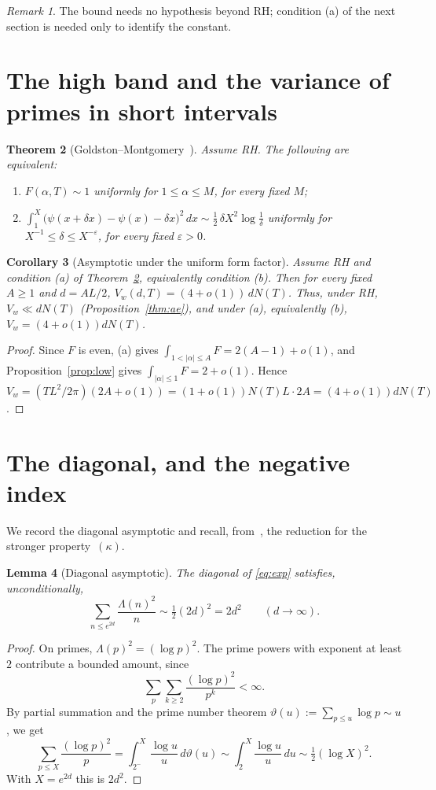 \documentclass[11pt]{amsart}
\newtheorem{theorem}{Theorem}[section]
\newtheorem{lemma}[theorem]{Lemma}
\newtheorem{corollary}[theorem]{Corollary}
\theoremstyle{definition}
\theoremstyle{remark}
\newtheorem{remark}[theorem]{Remark}
\begin{document}
\begin{remark}
The bound needs no hypothesis beyond RH; condition (a) of the next section is
needed only to identify the constant.
\end{remark}

\section{The high band and the variance of primes in short intervals}
\begin{theorem}[Goldston--Montgomery~\cite{GM}]\label{thm:gm}
Assume RH. The following are equivalent:
\begin{enumerate}
\item[(a)] $F(\alpha,T)\sim1$ uniformly for $1\le\alpha\le M$, for every fixed $M$;
\item[(b)] $\displaystyle\int_1^X\bigl(\psi(x+\delta x)-\psi(x)-\delta x\bigr)^2\,dx
\sim\tfrac12\,\delta X^2\log\tfrac1\delta$ uniformly for $X^{-1}\le\delta\le X^{-\varepsilon}$,
for every fixed $\varepsilon>0$.
\end{enumerate}
\end{theorem}

\begin{corollary}[Asymptotic under the uniform form factor]\label{cor:noncirc}
Assume RH and condition \emph{(a)} of Theorem~\ref{thm:gm}, equivalently
condition \emph{(b)}. Then for every fixed $A\ge1$ and $d=AL/2$,
$V_w(d,T)=(4+o(1))\,dN(T)$. Thus, under RH, $V_w\ll dN(T)$
(Proposition~\ref{thm:ae}), and under (a), equivalently (b), $V_w=(4+o(1))dN(T)$.
\end{corollary}
\begin{proof}
Since $F$ is even, (a) gives $\int_{1<|\alpha|\le A}F=2(A-1)+o(1)$, and
Proposition~\ref{prop:low} gives $\int_{|\alpha|\le1}F=2+o(1)$. Hence
$V_w=(TL^2/2\pi)(2A+o(1))=(1+o(1))N(T)L\cdot2A=(4+o(1))dN(T)$.
\end{proof}

\section{The diagonal, and the negative index}\label{sec:kappa}
We record the diagonal asymptotic and recall, from~\cite{RP16}, the reduction
for the stronger property~$(\kappa)$.

\begin{lemma}[Diagonal asymptotic]\label{lem:diag}
The diagonal of \eqref{eq:exp} satisfies, unconditionally,
\[
\sum_{n\le e^{2d}}\frac{\Lambda(n)^2}{n}\sim\tfrac12(2d)^2=2d^2\qquad(d\to\infty).
\]
\end{lemma}
\begin{proof}
On primes, $\Lambda(p)^2=(\log p)^2$. The prime powers with exponent at
least $2$ contribute a bounded amount, since
\[
\sum_p\sum_{k\ge2}\frac{(\log p)^2}{p^k}<\infty .
\]
By partial
summation and the prime number theorem $\vartheta(u):=\sum_{p\le u}\log p\sim u$,
we get
\[
\sum_{p\le X}\frac{(\log p)^2}{p}=\int_{2^-}^X\frac{\log u}{u}\,d\vartheta(u)
\sim\int_2^X\frac{\log u}{u}\,du\sim\tfrac12(\log X)^2 .
\]
With $X=e^{2d}$ this is
$2d^2$.
\end{proof}
\end{document}
